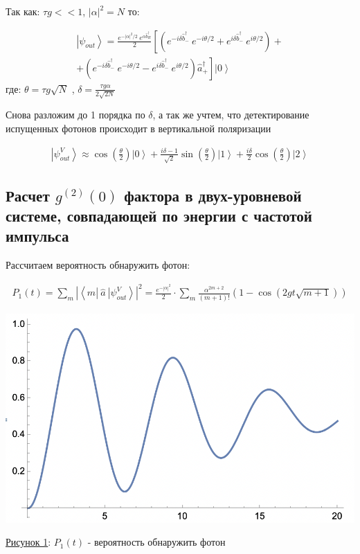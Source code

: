 \documentclass[11pt]{article}    %
\begin{document}
Так как: $\tau g << 1$, $ |\alpha|^2 = N $ то:

\begin{gather} \nonumber
    \left| \psi_{out} \right> = \frac{e^{-\left| \alpha \right|^2 / 2} \ e^{\alpha \hat{b}^{\dag}_{H}}}{2}  \left[ \left( e^{-i \delta \hat{b}^{\dag}_{-} } \ e^{-i \theta / 2} + e^{i \delta \hat{b}^{\dag}_{-} } \ e^{i \theta / 2} \right) \right. + \\
    + \left. \left( e^{-i \delta \hat{b}^{\dag}_{-} } \ e^{-i \theta / 2} - e^{i \delta \hat{b}^{\dag}_{-} } \ e^{i \theta / 2} \right) \hat{a}^{\dag}_{+} \right] \left| 0 \right>
\end{gather}
где: $\theta = \tau g \sqrt{N}$ , $\delta = \frac{\tau g \alpha}{2 \sqrt{2N}}$

Снова разложим до 1 порядка по $ \delta$, а так же учтем, что детектирование испущенных фотонов происходит в вертикальной поляризации

\begin{gather}
    \left| \psi_{out}^V \right> \approx \cos \left( \frac{\theta }{2} \right) \left| 0 \right> + \frac{i \delta - 1}{\sqrt{2}} \sin \left( \frac{\theta}{2} \right) \left| 1 \right> + \frac{i \delta}{2} \cos \left( \frac{\theta}{2} \right) \left| 2 \right>
\end{gather}

\subsection{Расчет $g^{(2)}(0)$ фактора в двух-уровневой системе, совпадающей по энергии с частотой импульса}
Рассчитаем вероятность обнаружить фотон:

\begin{gather}
    P_1 \left( t \right) = \sum_m \left| \left< m \left| \ \hat{a} \ \right| \psi_{out}^V \right> \right|^{2} = \frac{e^{-\left| \alpha \right|^2}}{2} \cdot \sum_m \frac{\alpha^{2m+2}}{\left( m+1 \right)!} \left( 1 - \cos \left( 2gt \sqrt{m+1} \right) \right)
\end{gather}

\par
\begin{center}
\includegraphics[scale = 0.75]{plot1.png}
\par
    \underline{Рисунок 1}: $P_1 \left( t \right)$ - вероятность обнаружить фотон
\end{center}
\par
\end{document}
